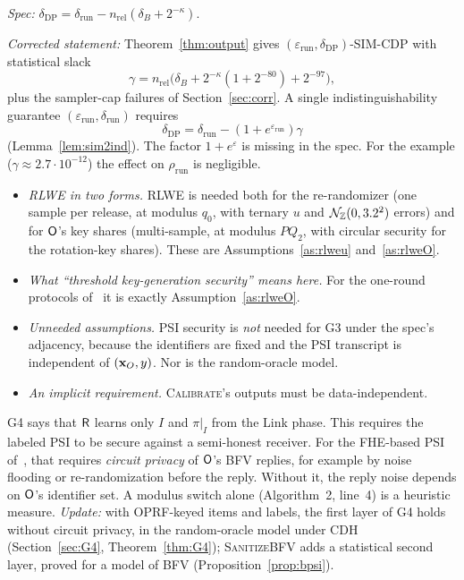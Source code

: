 \begin{correction}\label{cor:delta}
\emph{Spec:} $\delta_{\mathrm{DP}}=\delta_{\mathrm{run}}-n_{\mathrm{rel}}(\delta_B+2^{-\kappa})$.

\emph{Corrected statement:} Theorem~\ref{thm:output} gives $(\varepsilon_{\mathrm{run}},\delta_{\mathrm{DP}})$-SIM-CDP with statistical slack
\[
  \gamma=n_{\mathrm{rel}}\bigl(\delta_B+2^{-\kappa}(1+2^{-80})+2^{-97}\bigr),
\]
plus the sampler-cap failures of Section~\ref{sec:corr}. A single indistinguishability guarantee $(\varepsilon_{\mathrm{run}},\delta_{\mathrm{run}})$ requires
\[
  \delta_{\mathrm{DP}}=\delta_{\mathrm{run}}-(1+e^{\varepsilon_{\mathrm{run}}})\gamma
\]
(Lemma~\ref{lem:sim2ind}). The factor $1+e^{\varepsilon}$ is missing in the spec. For the example ($\gamma\approx2.7\cdot10^{-12}$) the effect on $\rho_{\mathrm{run}}$ is negligible.
\end{correction}

\begin{correction}\label{cor:assump}
\begin{itemize}[nosep]
  \item \emph{RLWE in two forms.} RLWE is needed both for the re-randomizer (one sample per release, at modulus $q_0$, with ternary $u$ and $\mathcal{N}_{\mathbb{Z}}(0,3.2^2)$ errors) and for $\mathsf{O}$'s key shares (multi-sample, at modulus $PQ_2$, with circular security for the rotation-key shares). These are Assumptions~\ref{as:rlweu} and~\ref{as:rlweO}.
  \item \emph{What ``threshold key-generation security'' means here.} For the one-round protocols of~\cite{MTBH21} it is exactly Assumption~\ref{as:rlweO}.
  \item \emph{Unneeded assumptions.} PSI security is \emph{not} needed for G3 under the spec's adjacency, because the identifiers are fixed and the PSI transcript is independent of $(\mathbf{x}_O,y)$. Nor is the random-oracle model.
  \item \emph{An implicit requirement.} \textsc{Calibrate}'s outputs must be data-independent.
\end{itemize}
\end{correction}

\begin{correction}\label{cor:psi}
G4 says that $\mathsf{R}$ learns only $I$ and $\pi|_I$ from the Link phase. This requires the labeled PSI to be secure against a semi-honest receiver. For the FHE-based PSI of~\cite{CLR17,CHLR18}, that requires \emph{circuit privacy} of $\mathsf{O}$'s BFV replies, for example by noise flooding or re-randomization before the reply. Without it, the reply noise depends on $\mathsf{O}$'s identifier set. A modulus switch alone (Algorithm~2, line~4) is a heuristic measure. \emph{Update:} with OPRF-keyed items and labels, the first layer of G4 holds without circuit privacy, in the random-oracle model under CDH (Section~\ref{sec:G4}, Theorem~\ref{thm:G4}); \textsc{SanitizeBFV} adds a statistical second layer, proved for a model of BFV (Proposition~\ref{prop:bpsi}). 
\end{correction}

